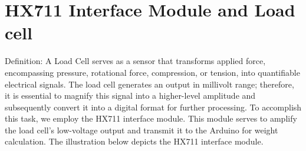 \documentclass[../report.tex]{subfiles}
\begin{document}
\maketitle
\section*{HX711 Interface Module and Load cell}

Definition: A Load Cell serves as a sensor that transforms applied force, encompassing pressure, rotational force, compression, or tension, into quantifiable electrical signals.
The load cell generates an output in millivolt range; therefore, it is essential to magnify this signal into a higher-level amplitude and subsequently convert it into a digital format for further processing.
To accomplish this task, we employ the HX711 interface module. This module serves to amplify the load cell's low-voltage output and transmit it to the Arduino for weight calculation. 
The illustration below depicts the HX711 interface module.
\end{document}
